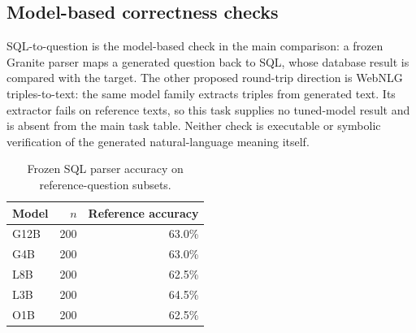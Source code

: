 \subsection{Model-based correctness checks}
SQL-to-question is the model-based check in the main comparison: a frozen Granite parser maps a generated question back to SQL, whose database result is compared with the target. The other proposed round-trip direction is WebNLG triples-to-text: the same model family extracts triples from generated text. Its extractor fails on reference texts, so this task supplies no tuned-model result and is absent from the main task table. Neither check is executable or symbolic verification of the generated natural-language meaning itself.
\begin{table}[t]\centering\small
\begin{tabular}{lrr}\toprule Model & $n$ & Reference accuracy \\\midrule
G12B & 200 & 63.0\% \\
G4B & 200 & 63.0\% \\
L8B & 200 & 62.5\% \\
L3B & 200 & 64.5\% \\
O1B & 200 & 62.5\% \\
\bottomrule\end{tabular}
\caption{Frozen SQL parser accuracy on reference-question subsets.}\label{tab:parser-calibration}\end{table}
